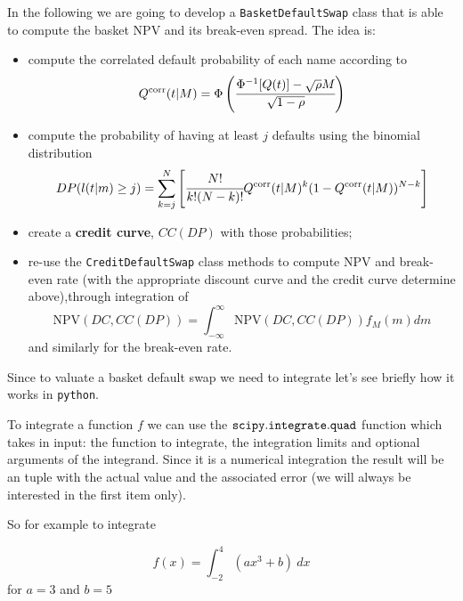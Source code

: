 In the following we are going to develop a \texttt{BasketDefaultSwap} class that is able to compute the basket NPV and its break-even spread.
The idea is:
\begin{itemize}
\item compute the correlated default probability of each name according to 
\begin{equation}Q^{\textrm{corr}}(t|M) = \Phi\left(\cfrac{\Phi^{-1}[Q(t)]-\sqrt{\rho} M}{\sqrt{1-\rho}}\right)\end{equation}
\item compute the probability of having at least $j$ defaults using the binomial distribution
\begin{equation}DP(l(t|m) \ge j) = \sum_{k=j}^{N}\left[  \cfrac{N!}{k!(N-k)!}Q^{\textrm{corr}}(t|M)^k(1-Q^{\textrm{corr}}(t|M))^{N-k}\right]\end{equation}
\item create a \textbf{credit curve}, $CC(DP)$ with those probabilities;
\item re-use the \texttt{CreditDefaultSwap} class methods to compute NPV and break-even rate (with the appropriate discount curve and the credit curve determine above),through integration of
\begin{equation}\mathrm{NPV}(DC, CC(DP)) = \int_{-\infty}^{\infty}{\mathrm{NPV}(DC, CC(DP)) f_M(m)dm} \end{equation}
and similarly for the break-even rate.
\end{itemize}

Since to valuate a basket default swap we need to integrate let's see briefly how it works in \texttt{python}.

To integrate a function \(f\) we can
use the \(\tt{scipy.integrate.quad}\) function which takes in input: the function to integrate, the integration limits and optional arguments of
the integrand. Since it is a numerical integration the result will be an tuple with the actual value and the associated error (we will always be interested in the first item only).

So for example to integrate

\[f(x) = \int_{-2}^{4}(ax^{3} + b)~dx\]
for \(a=3\) and \(b=5\)

